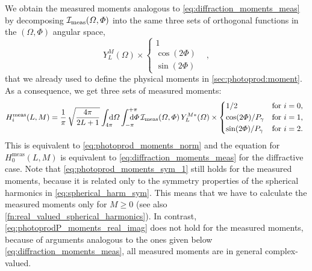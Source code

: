 We obtain the measured moments analogous to
\cref{eq:diffraction_moments_meas} by decomposing
$\mathcal{I}_\text{meas}(\Omega, \Phi)$ into the same three sets of
orthogonal functions in the $(\Omega, \Phi)$ angular space, \ie
\begin{equation}
  Y_L^M(\Omega) \times \begin{cases}
    1 & \\
    \cos(2 \Phi) & \\
    \sin(2 \Phi) &
  \end{cases},
\end{equation}
that we already used to define the physical moments in
\cref{sec:photoprod:moment}.  As a consequence, we get three sets of
measured moments:
\begin{equation}
  \label{eq:photoprod_moments_meas}
  H_i^\text{meas}(L, M)
  = \frac{1}{\pi}\, \sqrt{\frac{4 \pi}{2 L + 1}} \int_{4 \pi}\!\!\!\! \dif{\Omega} \int_{-\pi}^{+\pi}\hspace{-1.2em} \dif{\Phi}\,
  \intensity_\text{meas}(\Omega, \Phi)\, Y_L^{M *}(\Omega) \times \begin{cases*}
    1 / 2                   & for $i = 0$, \\
    \cos(2 \Phi) / P_\gamma & for $i = 1$, \\
    \sin(2 \Phi) / P_\gamma & for $i = 2$.
  \end{cases*}
\end{equation}
This is equivalent to
\cref{eq:photoprod_moments_norm}
and the equation for $H_0^\text{meas}(L, M)$ is equivalent to
\cref{eq:diffraction_moments_meas} for the diffractive case.  Note
that \cref{eq:photoprod_moments_sym_1} still holds for the measured
moments, because it is related only to the symmetry properties of the
spherical harmonics in \cref{eq:spherical_harm_sym}.  This means that
we have to calculate the measured moments only for $M \geq 0$ (see
also \cref{fn:real_valued_spherical_harmonics}).  In contrast,
\cref{eq:photoprodP_moments_real_imag} does not hold for the measured
moments, because of arguments analogous to the ones given below
\cref{eq:diffraction_moments_meas}, \ie all measured moments are in
general complex-valued.

